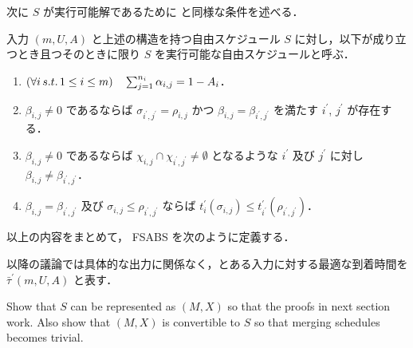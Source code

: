 次に $S$ が実行可能解であるために \textcite{czyzowicz} と同様な条件を述べる．
\begin{definition}\label{definition:fsabs-feasible-schedule}
  入力 $(m, U, A)$ と上述の構造を持つ自由スケジュール $S$ に対し，以下が成り立つとき且つそのときに限り $S$ を実行可能な自由スケジュールと呼ぶ．
  \begin{enumerate}
  \item $(\forall i\,s.t.\, 1 \leq i \leq m)\quad \sum_{j=1}^{n_i} \alpha_{i,j} = 1 - A_i$．
  \item $\beta_{i,j} \neq 0$ であるならば $\sigma_{i^\prime, j^\prime} = \rho_{i,j} \text{ かつ } \beta_{i,j} = \beta_{i^\prime, j^\prime}$ を満たす $i^\prime$, $j^\prime$ が存在する．
  \item $\beta_{i,j} \neq 0$ であるならば $\chi_{i,j} \cap \chi_{i^\prime,j^\prime} \neq \emptyset$ となるような $i^\prime$ 及び $j^\prime$ に対し $\beta_{i,j} \neq \beta_{i^\prime,j ^\prime}$．
  \item $\beta_{i,j} = \beta_{i^\prime, j^\prime}$ 及び $\sigma_{i,j} \leq \rho_{i^\prime, j^{\prime}}$ ならば $t^{\prime}_i(\sigma_{i, j}) \leq t^{\prime}_{i^\prime}(\rho_{i^\prime, j^\prime})$．
  \end{enumerate}
\end{definition}

以上の内容をまとめて， FSABS を次のように定義する．
\begin{problem}
\end{problem}
以降の議論では具体的な出力に関係なく，とある入力に対する最適な到着時間を $\bar\tau^\prime(m, U, A)$ と表す．

{\color{red} Show that $S$ can be represented as $(M, X)$ so that the proofs in next section work. Also show that $(M, X)$ is convertible to $S$ so that merging schedules becomes trivial.}